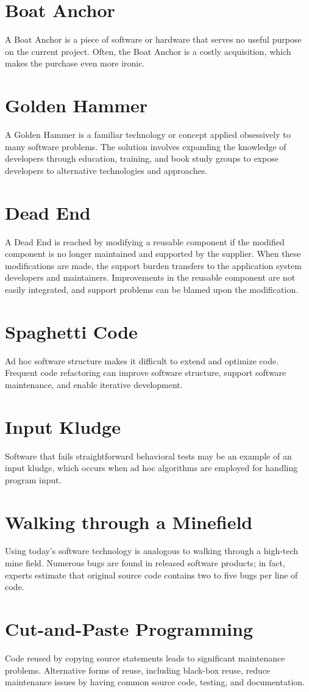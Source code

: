 \documentclass{book}
\begin{document}
\chapter{Boat Anchor}
A Boat Anchor is a piece of software or hardware that serves no useful purpose on the current project. Often, the Boat Anchor is a costly acquisition, which makes the purchase even more ironic.
\chapter{Golden Hammer}
A Golden Hammer is a familiar technology or concept applied obsessively to many software problems. 
The solution involves expanding the knowledge of developers through education, training, and book study groups to expose developers to alternative technologies and approaches.
\chapter{Dead End}
A Dead End is reached by modifying a reusable component if the modified component is no longer maintained and supported by the supplier.
When these modifications are made, the support burden transfers to the application system developers and maintainers.
Improvements in the reusable component are not easily integrated, and support problems can be blamed upon the modification.
\chapter{Spaghetti Code}
Ad hoc software structure makes it difficult to extend and optimize code. Frequent code refactoring can improve software structure, support software maintenance, and enable iterative development.
\chapter{Input Kludge}
Software that fails straightforward behavioral tests may be an example of an input kludge, which occurs when ad hoc algorithms are employed for handling program input.
\chapter{Walking through a Minefield}
Using today’s software technology is analogous to walking through a high-tech mine field.
Numerous bugs are found in released software products; in fact, experts estimate that original source code contains two to five bugs per line of code.
\chapter{Cut-and-Paste Programming}
Code reused by copying source statements leads to significant maintenance problems.
Alternative forms of reuse, including black-box reuse, reduce maintenance issues by having common source code, testing, and documentation.
\end{document}
